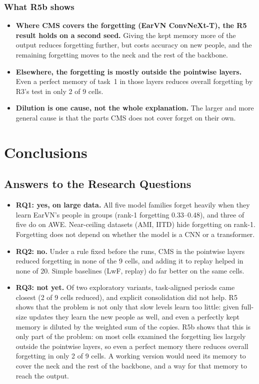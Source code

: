 \documentclass[12pt,a4paper]{report}
\begin{document}
\subsection{What R5b shows}
\begin{itemize}
\item \textbf{Where CMS covers the forgetting (EarVN ConvNeXt-T), the R5 result holds on a second seed.} Giving the kept memory more of the output reduces forgetting further, but costs accuracy on new people, and the remaining forgetting moves to the neck and the rest of the backbone.
\item \textbf{Elsewhere, the forgetting is mostly outside the pointwise layers.} Even a perfect memory of task~1 in those layers reduces overall forgetting by R3's test in only 2 of 9 cells.
\item \textbf{Dilution is one cause, not the whole explanation.} The larger and more general cause is that the parts CMS does not cover forget on their own.
\end{itemize}

\chapter{Conclusions}\label{ch:conclusions}

\section{Answers to the Research Questions}
\begin{itemize}
\item \textbf{RQ1: yes, on large data.} All five model families forget heavily when they learn EarVN's people in groups (rank-1 forgetting 0.33--0.48), and three of five do on AWE. Near-ceiling datasets (AMI, IITD) hide forgetting on rank-1. Forgetting does not depend on whether the model is a CNN or a transformer.
\item \textbf{RQ2: no.} Under a rule fixed before the runs, CMS in the pointwise layers reduced forgetting in none of the 9 cells, and adding it to replay helped in none of 20. Simple baselines (LwF, replay) do far better on the same cells.
\item \textbf{RQ3: not yet.} Of two exploratory variants, task-aligned periods came closest (2 of 9 cells reduced), and explicit consolidation did not help. R5 shows that the problem is not only that slow levels learn too little: given full-size updates they learn the new people as well, and even a perfectly kept memory is diluted by the weighted sum of the copies. R5b shows that this is only part of the problem: on most cells examined the forgetting lies largely outside the pointwise layers, so even a perfect memory there reduces overall forgetting in only 2 of 9 cells. A working version would need its memory to cover the neck and the rest of the backbone, and a way for that memory to reach the output.
\end{itemize}
\end{document}
